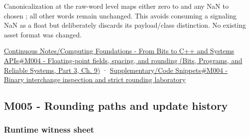 Canonicalization at the raw-word level maps either zero to  and any NaN to chosen ; all other words remain unchanged. This avoids consuming a signaling NaN as a float but deliberately discards its payload/class distinction. No existing asset format was changed.

\href{../01-Bits-Programs-and-Reliable-Systems-P03/main.pdf\#nameddest=01-foundations-i-ch011-m004---floating-point-fields-spacing-and-rounding}{Continuous Notes/Computing Foundations - From Bits to C++ and Systems APIs\#M004 - Floating-point fields, spacing, and rounding (Bits, Programs, and Reliable Systems, Part 3, Ch. 9)} · \hyperref[appendix-4e2236f53445-m004---binary-interchange-inspection-and-strict-rounding-laboratory]{Supplementary/Code Snippets\#M004 - Binary interchange inspection and strict rounding laboratory}

\subsection{M005 - Rounding paths and update history}\label{appendix-92ff77d4dfdc-m005---rounding-paths-and-update-history}

\hypertarget{appendix-92ff77d4dfdc-m005---rounding-paths-and-update-history}{}

\subsubsection{Runtime witness sheet}\label{appendix-92ff77d4dfdc-runtime-witness-sheet}

\hypertarget{appendix-92ff77d4dfdc-runtime-witness-sheet}{}

